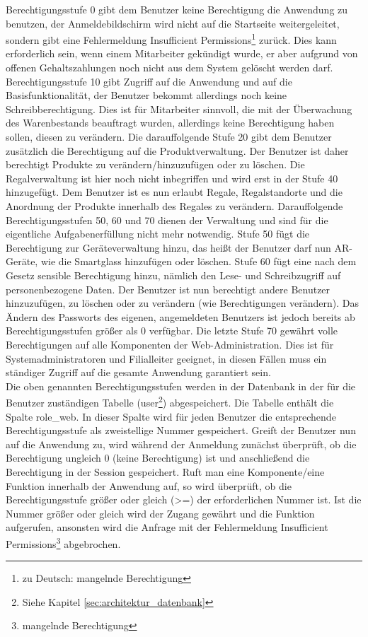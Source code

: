Berechtigungsstufe 0 gibt dem Benutzer keine Berechtigung die Anwendung zu benutzen, der Anmeldebildschirm wird nicht auf die Startseite weitergeleitet, sondern gibt eine Fehlermeldung \glqq Insufficient Permissions\grqq\footnote{zu Deutsch: \glqq mangelnde Berechtigung\grqq} zurück. Dies kann erforderlich sein, wenn einem Mitarbeiter gekündigt wurde, er aber aufgrund von \zB offenen Gehaltszahlungen noch nicht aus dem System gelöscht werden darf. Berechtigungsstufe 10 gibt Zugriff auf die Anwendung und auf die Basisfunktionalität, der Benutzer bekommt allerdings noch keine Schreibberechtigung. Dies ist für Mitarbeiter sinnvoll, die mit der Überwachung des Warenbestands beauftragt wurden, allerdings keine Berechtigung haben sollen, diesen zu verändern. Die darauffolgende Stufe 20 gibt dem Benutzer zusätzlich die Berechtigung auf die Produktverwaltung. Der Benutzer ist daher berechtigt Produkte zu verändern/hinzuzufügen oder zu löschen. Die Regalverwaltung ist hier noch nicht inbegriffen und wird erst in der Stufe 40 hinzugefügt. Dem Benutzer ist es nun erlaubt Regale, Regalstandorte und die Anordnung der Produkte innerhalb des Regales zu verändern. Darauffolgende Berechtigungsstufen 50, 60 und 70 dienen der Verwaltung und sind für die eigentliche Aufgabenerfüllung nicht mehr notwendig. Stufe 50 fügt die Berechtigung zur Geräteverwaltung hinzu, das heißt der Benutzer darf nun \ac{AR}-Geräte, wie \zB die Smartglass hinzufügen oder löschen. Stufe 60 fügt eine nach dem Gesetz sensible Berechtigung hinzu, nämlich den Lese- und Schreibzugriff auf personenbezogene Daten. Der Benutzer ist nun berechtigt andere Benutzer hinzuzufügen, zu löschen oder zu verändern (wie \zB Berechtigungen verändern). Das Ändern des Passworts des eigenen, angemeldeten Benutzers ist jedoch bereits ab Berechtigungsstufen größer als 0 verfügbar. Die letzte Stufe 70 gewährt volle Berechtigungen auf alle Komponenten der Web-Administration. Dies ist für Systemadministratoren und Filialleiter geeignet, in diesen Fällen muss ein ständiger Zugriff auf die gesamte Anwendung garantiert sein.\\

Die oben genannten Berechtigungsstufen werden in der Datenbank in der für die Benutzer zuständigen Tabelle (user\footnote{Siehe Kapitel \ref{sec:architektur_datenbank} }) abgespeichert. Die Tabelle enthält die Spalte role\_web. In dieser Spalte wird für jeden Benutzer die entsprechende Berechtigungsstufe als zweistellige Nummer gespeichert. Greift der Benutzer nun auf die Anwendung zu, wird während der Anmeldung zunächst überprüft, ob die Berechtigung ungleich 0 (keine Berechtigung) ist und anschließend die Berechtigung in der Session gespeichert. Ruft man eine Komponente/eine Funktion innerhalb der Anwendung auf, so wird überprüft, ob die Berechtigungsstufe größer oder gleich (>=) der erforderlichen Nummer ist. Ist die Nummer größer oder gleich wird der Zugang gewährt und die Funktion aufgerufen, ansonsten wird die Anfrage mit der Fehlermeldung \glqq Insufficient Permissions\grqq\footnote{\glqq mangelnde Berechtigung\grqq} abgebrochen.

